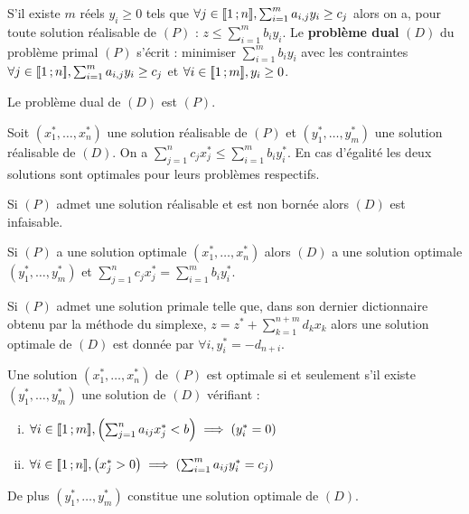 S'il existe $m$ réels $y_i \geq 0$ tels que $\forall j \in \mathopen{[\![}1\mathclose{}\mathpunct{};n\mathclose{]\!]}, \sum_{i = 1}^m a_{i,j} y_i \geq c_j$ alors on a, pour toute solution réalisable de $(P)$ : $z \leq \sum_{i = 1}^m b_i y_i$.
Le \textbf{problème dual} $(D)$ du problème primal $(P)$ s'écrit : minimiser $\sum_{i = 1}^m b_i y_i$ avec les contraintes $\forall j \in \mathopen{[\![}1\mathclose{}\mathpunct{};n\mathclose{]\!]}, \sum_{i = 1}^m a_{i,j} y_i \geq c_j$ et $\forall i \in \mathopen{[\![}1\mathclose{}\mathpunct{};m\mathclose{]\!]}, y_i \geq 0$.

\begin{rem}
	Le problème dual de $(D)$ est $(P)$.
\end{rem}

\begin{pop}
	Soit $(x_1^*, \ldots, x_n^*)$ une solution réalisable de $(P)$ et $(y_1^*, \ldots, y_m^*)$ une solution réalisable de $(D)$.
	On a $\sum_{j = 1}^n c_j x_j^* \leq \sum_{i = 1}^m b_i y_i^*$.
	En cas d'égalité les deux solutions sont optimales pour leurs problèmes respectifs.
\end{pop}

\begin{cor}
	Si $(P)$ admet une solution réalisable et est non bornée alors $(D)$ est infaisable.
\end{cor}

\begin{thm}[de la dualité]
	Si $(P)$ a une solution optimale $(x_1^*, \ldots, x_n^*)$ alors $(D)$ a une solution optimale $(y_1^*, \ldots, y_m^*)$ et $\sum_{j = 1}^n c_j x_j^* = \sum_{i = 1}^m b_i y_i^*$.
\end{thm}

\begin{pop}
	Si $(P)$ admet une solution primale telle que, dans son dernier dictionnaire obtenu par la méthode du simplexe, $z = z^* + \sum_{k = 1}^{n + m} d_k x_k$ alors une solution optimale de $(D)$ est donnée par $\forall i, y_i^* = - d_{n + i}$.
\end{pop}

\begin{thm}
	Une solution $(x_1^*, \ldots, x_n^*)$ de $(P)$ est optimale si et seulement s'il existe $(y_1^*, \ldots, y_m^*)$ une solution de $(D)$ vérifiant :
	\begin{enumerate}[(i)]
		\item[\textbullet] $\forall i \in \mathopen{[\![}1\mathclose{}\mathpunct{};m\mathclose{]\!]}, \left( \sum_{j = 1}^n a_{ij} x_j^* < b \right) \implies \left( y_i^* = 0 \right)$
		\item[\textbullet] $\forall i \in \mathopen{[\![}1\mathclose{}\mathpunct{};n\mathclose{]\!]}, \left( x_j^* > 0 \right) \implies \left( \sum_{i = 1}^m a_{ij} y_i^* = c_j \right)$
	\end{enumerate}
	De plus $(y_1^*, \ldots, y_m^*)$ constitue une solution optimale de $(D)$.
\end{thm}

